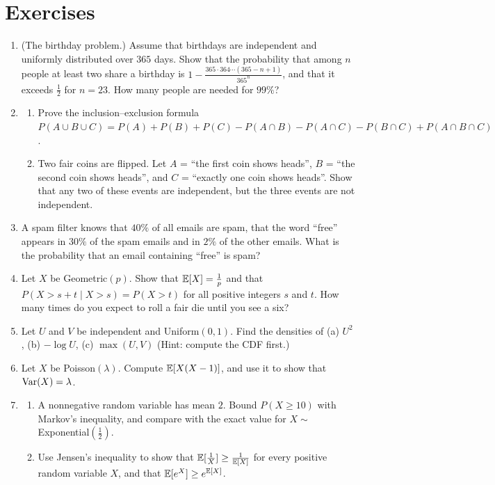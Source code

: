 \section{Exercises}\label{L4-sec:exercises}
\begin{enumerate}[leftmargin=*]
    \item (The birthday problem.) Assume that birthdays are independent and uniformly distributed over $365$ days. Show that the probability that among $n$ people at least two share a birthday is $1 - \frac{365 \cdot 364 \cdots (365 - n + 1)}{365^n}$, and that it exceeds $\frac{1}{2}$ for $n = 23$. How many people are needed for $99\%$?
    \item \begin{enumerate}[label=(\alph*)]
        \item Prove the inclusion--exclusion formula $P(A \cup B \cup C) = P(A) + P(B) + P(C) - P(A \cap B) - P(A \cap C) - P(B \cap C) + P(A \cap B \cap C)$.
        \item Two fair coins are flipped. Let $A$ = ``the first coin shows heads'', $B$ = ``the second coin shows heads'', and $C$ = ``exactly one coin shows heads''. Show that any two of these events are independent, but the three events are not independent.
    \end{enumerate}
    \item \homework{} A spam filter knows that $40\%$ of all emails are spam, that the word ``free'' appears in $30\%$ of the spam emails and in $2\%$ of the other emails. What is the probability that an email containing ``free'' is spam?
    \item Let $X$ be Geometric$(p)$. Show that $\mathbb{E}[X] = \frac{1}{p}$ and that $P(X > s + t \mid X > s) = P(X > t)$ for all positive integers $s$ and $t$. How many times do you expect to roll a fair die until you see a six?
    \item \homework{} Let $U$ and $V$ be independent and Uniform$(0, 1)$. Find the densities of (a) $U^2$, (b) $-\log U$, (c) $\max(U, V)$ (Hint: compute the CDF first.)
    \item Let $X$ be Poisson$(\lambda)$. Compute $\mathbb{E}[X(X - 1)]$, and use it to show that $\operatorname{Var}(X) = \lambda$.
    \item \begin{enumerate}[label=(\alph*)]
        \item A nonnegative random variable has mean $2$. Bound $P(X \geq 10)$ with Markov's inequality, and compare with the exact value for $X \sim$ Exponential$(\frac{1}{2})$.
        \item Use Jensen's inequality to show that $\mathbb{E}[\frac{1}{X}] \geq \frac{1}{\mathbb{E}[X]}$ for every positive random variable $X$, and that $\mathbb{E}[e^X] \geq e^{\mathbb{E}[X]}$.

\end{enumerate}
\end{enumerate}
